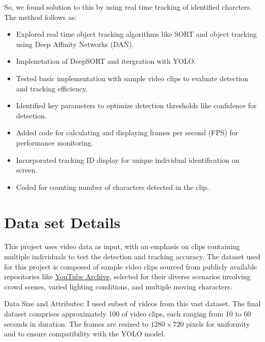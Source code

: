 \documentclass[twoside,english]{article}
\begin{document}
    So, we found solution to this by using real time tracking of identified charcters.
    The method follows as:
    \begin{itemize}
    \setlength{\itemsep}{0.5mm}
        \item Explored real time object tracking algorithms like SORT and object tracking using Deep Affinity Networks (DAN).
        \item Implenetation of DeepSORT and itergration with YOLO.
        \item Tested basic implementation with sample video clips to evaluate detection and tracking efficiency.
        \item Identified key parameters to optimize detection thresholds like confidence for detection.
        \item Added code for calculating and displaying frames per second (FPS) for performance monitoring.
        \item Incorporated tracking ID display for unique individual identification on screen.
        \item Coded for counting number of characters detected in the clip.

    \end{itemize}

\section{Data set Details} \label{sec:data}

    This project uses video data as input, with an emphasis on clips containing multiple individuals to test the detection and tracking accuracy. The dataset used for this project is composed of sample video clips sourced from publicly available repositories like \href{https://archive.org/details/youtubecrawl}{YouTube Archive}, selected for their diverse scenarios involving crowd scenes, varied lighting conditions, and multiple moving characters.

    Data Size and Attributes: I used subset of videos from this vast dataset. The final dataset comprises approximately 100 of video clips, each ranging from 10 to 60 seconds in duration. The frames are resized to $1280 \times 720$ pixels for uniformity and to ensure compatibility with the YOLO model.
\end{document}
